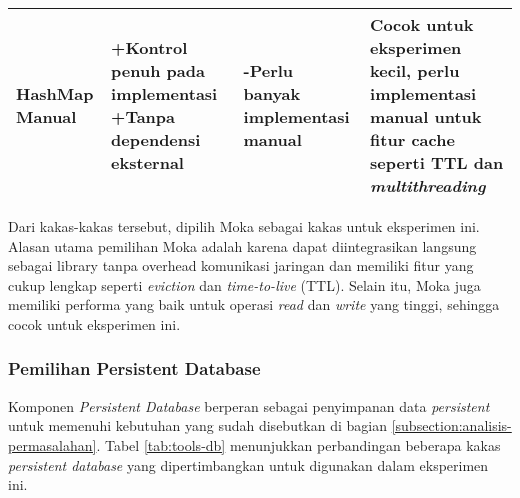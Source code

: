 \begin{table}[h]
{\begin{tabular}{|l|p{5cm}|p{5cm}|p{3cm}|}
            HashMap Manual & +Kontrol penuh pada implementasi \newline +Tanpa dependensi eksternal & -Perlu banyak implementasi manual & Cocok untuk eksperimen kecil, perlu implementasi manual untuk fitur cache seperti TTL dan \textit{multithreading}\\ \hline
        \end{tabular}
    }
    \label{tab:tools-kv}
\end{table}

Dari kakas-kakas tersebut, dipilih Moka sebagai kakas untuk eksperimen ini. Alasan utama pemilihan Moka adalah karena dapat diintegrasikan langsung sebagai library tanpa overhead komunikasi jaringan dan memiliki fitur yang cukup lengkap seperti \textit{eviction} dan \textit{time-to-live} (TTL). Selain itu, Moka juga memiliki performa yang baik untuk operasi \textit{read} dan \textit{write} yang tinggi, sehingga cocok untuk eksperimen ini.

\subsubsection{Pemilihan Persistent Database}
\label{subsubsection:persistent-database}

Komponen \textit{Persistent Database} berperan sebagai penyimpanan data \textit{persistent} untuk memenuhi kebutuhan yang sudah disebutkan di bagian \ref{subsection:analisis-permasalahan}. Tabel \ref{tab:tools-db} menunjukkan perbandingan beberapa kakas \textit{persistent database} yang dipertimbangkan untuk digunakan dalam eksperimen ini.

